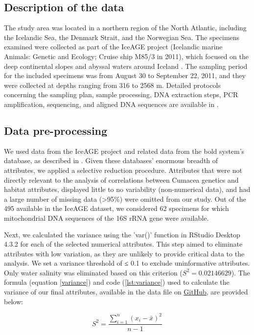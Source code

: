\subsection{Description of the data}
The study area was located in a northern region of the North Atlantic, including the Icelandic Sea, the Denmark Strait, and the Norwegian Sea. The specimens examined were collected as part of the IceAGE project (Icelandic marine Animals: Genetic and Ecology; Cruise ship M85/3 in 2011), which focused on the deep continental slopes and abyssal waters around Iceland \citep{meisner_prefacebiodiversity_2018}. The sampling period for the included specimens was from August 30 to September 22, 2011, and they were collected at depths ranging from 316 to 2568 m. Detailed protocols concerning the sampling plan, sample processing, DNA extraction steps, PCR amplification, sequencing, and aligned DNA sequences are available in \citep{uhlir_adding_2021}.

\subsection{Data pre-processing}
We used data from the IceAGE project and related data from the bold system's database, as described in \citep{uhlir_adding_2021}. Given these databases' enormous breadth of attributes, we applied a selective reduction procedure. Attributes that were not directly relevant to the analysis of correlations between Cumacea genetics and habitat attributes, displayed little to no variability (non-numerical data), and had a large number of missing data (>95\%) were omitted from our study. Out of the 495 available in the IceAGE dataset, we considered 62 specimens for which mitochondrial DNA sequences of the 16S rRNA gene were available. 

Next, we calculated the variance using the 'var()' function in RStudio Desktop 4.3.2 for each of the selected numerical attributes. This step aimed to eliminate attributes with low variation, as they are unlikely to provide critical data to the analysis. We set a variance threshold of ≤ 0.1 to exclude uninformative attributes. Only water salinity was eliminated based on this criterion ($S^2 = 0.02146629$). The formula (equation \ref{variance}) and code (\autoref{lst:variance}) used to calculate the variance of our final attributes, available in the data file on \href{https://github.com/tahiri-lab/Cumacea_aPhyloGeo}{GitHub}, are provided below:

\begin{equation}\label{variance}
    S^2 = \frac{\sum_{i=1}^{n} (x_i - \bar{x})^2}{n-1}
\end{equation}

